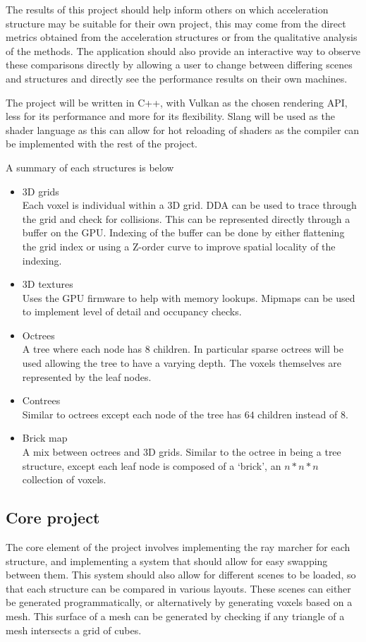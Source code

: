 The results of this project should help inform others on which
acceleration structure may be suitable for their own project, this
may come from the direct metrics obtained from the acceleration
structures or from the qualitative analysis of the methods.
The application should also provide an interactive way to observe these
comparisons directly by allowing a user to change between differing scenes
and structures and directly see the performance results on their own machines.

The project will be written in C++, with Vulkan as the chosen rendering API,
less for its performance and more for its flexibility.
Slang will be used as the shader language as this can allow for hot reloading
of shaders as the compiler can be implemented with the rest of the project.

A summary of each structures is below
\begin{itemize}[noitemsep]
  \item 3D grids \\
    Each voxel is individual within a 3D grid. DDA can be used to
    trace through the grid and check for collisions. This can be
    represented directly through a buffer on the GPU. Indexing of the buffer
    can be done by either flattening the grid index or using a Z-order curve
    to improve spatial locality of the indexing.
  \item 3D textures \\
    Uses the GPU firmware to help with memory lookups. Mipmaps
    can be used to implement level of detail and occupancy checks.
  \item Octrees \\
    A tree where each node has 8 children. In particular sparse octrees will be
    used allowing the tree to have a varying depth. The voxels themselves are
    represented by the leaf nodes.
  \item Contrees \\
    Similar to octrees except each node of the tree has $64$ children
    instead of $8$.
  \item Brick map \\
    A mix between octrees and 3D grids. Similar to the octree in
    being a tree structure, except each leaf node is composed of a `brick', an
    $n*n*n$ collection of voxels.
\end{itemize}

\subsection*{Core project}
The core element of the project involves implementing the ray marcher
for each structure, and implementing a system that should allow
for easy swapping between them. This system should also allow for different
scenes to be loaded, so that each structure can be compared in various layouts.
These scenes can either be generated programmatically, or
alternatively by generating voxels based on a mesh. This surface of a mesh can
be generated by checking if any triangle of a mesh intersects a grid of cubes.

